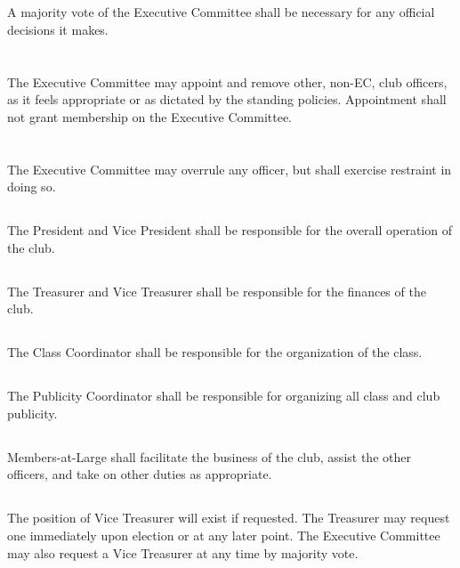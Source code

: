 \documentclass{bylaws}
\begin{document}
\section{}A majority vote of the Executive Committee shall be necessary for any official decisions it makes.
\section{}The Executive Committee may appoint and remove other, non-EC, club officers, as it feels appropriate or as dictated by the standing policies. Appointment shall not grant membership on the Executive Committee.
\section{}The Executive Committee may overrule any officer, but shall exercise restraint in doing so.

\subsection{}The President and Vice President shall be responsible for the overall operation of the club.
\subsection{}The Treasurer and Vice Treasurer shall be responsible for the finances of the club.
\subsection{}The Class Coordinator shall be responsible for the organization of the class.
\subsection{}The Publicity Coordinator shall be responsible for organizing all class and club publicity.
\subsection{}Members-at-Large shall facilitate the business of the club, assist the other officers, and take on other duties as appropriate.

\subsection{}The position of Vice Treasurer will exist if requested. The Treasurer may request one immediately upon election or at any later point. The Executive Committee may also request a Vice Treasurer at any time by majority vote.
\end{document}
